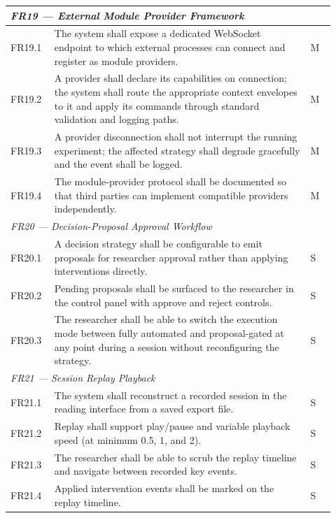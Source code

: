 \begin{longtable}{%
  p{0.12\linewidth}
  p{0.73\linewidth}
  p{0.07\linewidth}
}
\multicolumn{3}{l}{\textit{FR19 — External Module Provider Framework}} \\
\midrule
FR19.1 & The system shall expose a dedicated WebSocket endpoint to which
         external processes can connect and register as module providers. & M \\
FR19.2 & A provider shall declare its capabilities on connection; the system
         shall route the appropriate context envelopes to it and apply its
         commands through standard validation and logging paths. & M \\
FR19.3 & A provider disconnection shall not interrupt the running experiment;
         the affected strategy shall degrade gracefully and the event shall
         be logged. & M \\
FR19.4 & The module-provider protocol shall be documented so that third
         parties can implement compatible providers independently. & M \\
\midrule

\multicolumn{3}{l}{\textit{FR20 — Decision-Proposal Approval Workflow}} \\
\midrule
FR20.1 & A decision strategy shall be configurable to emit proposals for
         researcher approval rather than applying interventions directly. & S \\
FR20.2 & Pending proposals shall be surfaced to the researcher in the control
         panel with approve and reject controls. & S \\
FR20.3 & The researcher shall be able to switch the execution mode between
         fully automated and proposal-gated at any point during a session
         without reconfiguring the strategy. & S \\
\midrule

\multicolumn{3}{l}{\textit{FR21 — Session Replay Playback}} \\
\midrule
FR21.1 & The system shall reconstruct a recorded session in the reading
         interface from a saved export file. & S \\
FR21.2 & Replay shall support play/pause and variable playback speed (at
         minimum 0.5\texttimes{}, 1\texttimes{}, and 2\texttimes{}). & S \\
FR21.3 & The researcher shall be able to scrub the replay timeline and
         navigate between recorded key events. & S \\
FR21.4 & Applied intervention events shall be marked on the replay timeline. & S \\
\midrule


\end{longtable}
